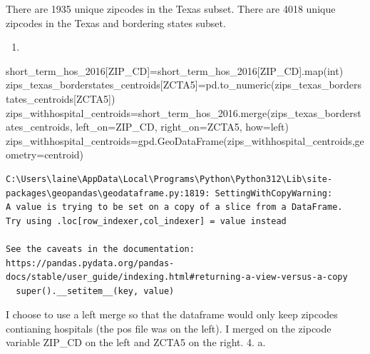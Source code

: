 \documentclass[
  letterpaper,
  DIV=11,
  numbers=noendperiod]{scrartcl}
\newenvironment{Shaded}{\begin{snugshade}}{\end{snugshade}}
\newcommand{\BuiltInTok}[1]{\textcolor[rgb]{0.00,0.23,0.31}{#1}}
\newcommand{\NormalTok}[1]{\textcolor[rgb]{0.00,0.23,0.31}{#1}}
\newcommand{\OperatorTok}[1]{\textcolor[rgb]{0.37,0.37,0.37}{#1}}
\newcommand{\StringTok}[1]{\textcolor[rgb]{0.13,0.47,0.30}{#1}}
\providecommand{\tightlist}{%
  \setlength{\itemsep}{0pt}\setlength{\parskip}{0pt}}\usepackage{longtable,booktabs,array}
\begin{document}
There are 1935 unique zipcodes in the Texas subset. There are 4018
unique zipcodes in the Texas and bordering states subset.

\begin{enumerate}
\def\labelenumi{\arabic{enumi}.}
\setcounter{enumi}{2}
\tightlist
\item
\end{enumerate}

\begin{Shaded}
\begin{Highlighting}[]
\NormalTok{short\_term\_hos\_2016[}\StringTok{\textquotesingle{}ZIP\_CD\textquotesingle{}}\NormalTok{]}\OperatorTok{=}\NormalTok{short\_term\_hos\_2016[}\StringTok{\textquotesingle{}ZIP\_CD\textquotesingle{}}\NormalTok{].}\BuiltInTok{map}\NormalTok{(}\BuiltInTok{int}\NormalTok{)}
\NormalTok{zips\_texas\_borderstates\_centroids[}\StringTok{\textquotesingle{}ZCTA5\textquotesingle{}}\NormalTok{]}\OperatorTok{=}\NormalTok{pd.to\_numeric(zips\_texas\_borderstates\_centroids[}\StringTok{\textquotesingle{}ZCTA5\textquotesingle{}}\NormalTok{])}
\NormalTok{zips\_withhospital\_centroids}\OperatorTok{=}\NormalTok{short\_term\_hos\_2016.merge(zips\_texas\_borderstates\_centroids, left\_on}\OperatorTok{=}\StringTok{\textquotesingle{}ZIP\_CD\textquotesingle{}}\NormalTok{, right\_on}\OperatorTok{=}\StringTok{\textquotesingle{}ZCTA5\textquotesingle{}}\NormalTok{, how}\OperatorTok{=}\StringTok{\textquotesingle{}left\textquotesingle{}}\NormalTok{)}
\NormalTok{zips\_withhospital\_centroids}\OperatorTok{=}\NormalTok{gpd.GeoDataFrame(zips\_withhospital\_centroids,geometry}\OperatorTok{=}\StringTok{\textquotesingle{}centroid\textquotesingle{}}\NormalTok{)}
\end{Highlighting}
\end{Shaded}

\begin{verbatim}
C:\Users\laine\AppData\Local\Programs\Python\Python312\Lib\site-packages\geopandas\geodataframe.py:1819: SettingWithCopyWarning: 
A value is trying to be set on a copy of a slice from a DataFrame.
Try using .loc[row_indexer,col_indexer] = value instead

See the caveats in the documentation: https://pandas.pydata.org/pandas-docs/stable/user_guide/indexing.html#returning-a-view-versus-a-copy
  super().__setitem__(key, value)
\end{verbatim}

I choose to use a left merge so that the dataframe would only keep
zipcodes contianing hospitals (the pos file was on the left). I merged
on the zipcode variable ZIP\_CD on the left and ZCTA5 on the right. 4.
a.
\end{document}
